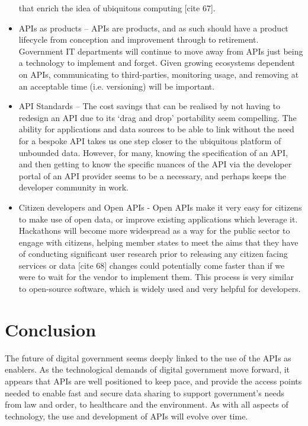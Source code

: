\begin{itemize}
	that enrich the idea of ubiquitous computing [cite 67].
	\item APIs as products – APIs are products, and as such should have a
	product lifecycle from conception and improvement through to retirement.
	Government IT departments will continue to move away from APIs just being
	a technology to implement and forget. Given growing ecosystems dependent
	on APIs, communicating to third-parties, monitoring usage, and removing at
	an acceptable time (i.e. versioning) will be important.
	\item API Standards – The cost savings that can be realised by not having
	to redesign an API due to its ‘drag and drop’ portability seem compelling.
	The ability for applications and data sources to be able to link without
	the need for a bespoke API takes us one step closer to the ubiquitous platform
	of unbounded data. However, for many, knowing the specification of an API,
	and then getting to know the specific nuances of the API via the developer
	portal of an API provider seems to be a	necessary, and perhaps keeps the
	developer community in work.
	\item Citizen developers and Open APIs - Open APIs make it very easy for
	citizens to make use of	open data, or improve existing applications which
	leverage it. Hackathons will become more widespread as a way for the public
	sector to engage with citizens, helping member states to meet the aims that
	they have of conducting significant user research prior to releasing any
	citizen facing services or data [cite 68] changes could potentially come
	faster than if we were to wait for the vendor to implement them. This process
	is very similar to open-source software, which is widely used and very
	helpful for developers.
\end{itemize}

\section{Conclusion}

The future of digital government seems deeply linked to the use of the APIs as
enablers. As the technological demands of digital government move forward, it
appears that APIs are well positioned to keep pace, and provide the access points
needed to enable fast and secure data sharing to support government’s needs from
law and order, to healthcare and the environment. As with all aspects of technology,
the use and development of APIs will evolve over time.